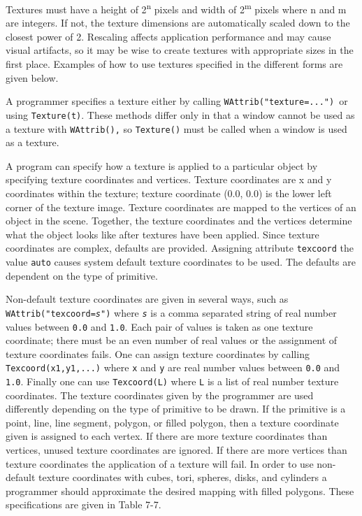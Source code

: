 Textures must have a height of 2\textsuperscript{n} pixels and width
of 2\textsuperscript{m} pixels where n and m are integers. If not, the
texture dimensions are automatically scaled down to the closest power
of 2. Rescaling affects application performance and may cause visual
artifacts, so it may be wise to create textures with appropriate sizes
in the first place. Examples of how to use textures specified in the
different forms are given below.

A programmer specifies a texture either by calling
\texttt{WAttrib("texture=...")}\texttt{ }or using
\texttt{Texture(t)}. These methods differ only in that a window cannot
be used as a texture with \texttt{WAttrib(),} so \texttt{Texture()}
must be called when a window is used as a texture.

A program can specify how a texture is applied to a particular object
by specifying texture coordinates and vertices. Texture coordinates
are x and y coordinates within the texture; texture coordinate (0.0,
0.0) is the lower left corner of the texture image. Texture
coordinates are mapped to the vertices of an object in the
scene. Together, the texture coordinates and the vertices determine
what the object looks like after textures have been applied.  Since
texture coordinates are complex, defaults are provided. Assigning
attribute \texttt{texcoord} the value \texttt{auto} causes system
default texture coordinates to be used. The defaults are dependent on
the type of primitive.

Non-default texture coordinates are given in several ways, such as \linebreak
\texttt{WAttrib("texcoord=}\texttt{\textit{s"}}\texttt{)}
where \texttt{\textit{s}} is a comma separated string of real number
values between \texttt{0.0} and \texttt{1.0}. Each pair of values is
taken as one texture coordinate; there must be an even number of real
values or the assignment of texture coordinates fails. One
can assign texture coordinates by calling \texttt{Texcoord(x1,y1,...)}
where \texttt{x} and \texttt{y} are real number values between
\texttt{0.0} and \texttt{1.0}. Finally one can use \texttt{Texcoord(L)}
where \texttt{L} is a list of real number texture coordinates. The
texture coordinates given by the programmer are used differently
depending on the type of primitive to be drawn. If the primitive is a
point, line, line segment, polygon, or filled polygon, then a texture
coordinate given is assigned to each vertex. If there are more texture
coordinates than vertices, unused texture coordinates are ignored. If
there are more vertices than texture coordinates the application of a
texture will fail. In order to use non-default texture coordinates
with cubes, tori, spheres, disks, and cylinders a programmer should
approximate the desired mapping with filled polygons. These
specifications are given in Table 7-7.


